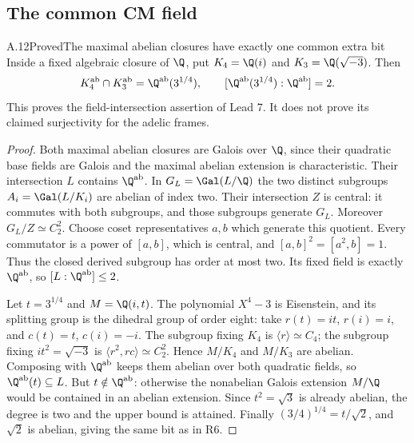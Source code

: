 \subsection{The common CM field}

\begin{statement}{A.12}{Proved}{The maximal abelian closures have exactly one common extra bit}
Inside a fixed algebraic closure of $\Q$, put
$K_4=\Q(i)$ and $K_3=\Q(\sqrt{-3})$. Then
\[
 K_4^{\rm ab}\cap K_3^{\rm ab}
       =\Q^{\rm ab}(3^{1/4}),\qquad
 [\Q^{\rm ab}(3^{1/4}):\Q^{\rm ab}]=2.
\]
This proves the field-intersection assertion of Lead 7. It
does not prove its claimed surjectivity for the adelic frames.
\end{statement}
\begin{proof}
Both maximal abelian closures are Galois over $\Q$, since
their quadratic base fields are Galois and the maximal
abelian extension is characteristic. Their intersection $L$
contains $\Q^{\rm ab}$. In $G_L=\Gal(L/\Q)$ the two
distinct subgroups $A_i=\Gal(L/K_i)$ are abelian of index
two. Their intersection $Z$ is central: it commutes with
both subgroups, and those subgroups generate $G_L$.
Moreover $G_L/Z\simeq C_2^2$. Choose coset representatives
$a,b$ which generate this quotient. Every commutator is
a power of $[a,b]$, which is central, and
$[a,b]^2=[a^2,b]=1$. Thus the closed derived subgroup
has order at most two. Its fixed field is exactly
$\Q^{\rm ab}$, so $[L:\Q^{\rm ab}]\le2$.

Let $t=3^{1/4}$ and $M=\Q(i,t)$. The polynomial $X^4-3$
is Eisenstein, and its splitting group is the dihedral group
of order eight: take $r(t)=it$, $r(i)=i$, and
$c(t)=t$, $c(i)=-i$. The subgroup fixing $K_4$ is
$\langle r\rangle\simeq C_4$; the subgroup fixing
$it^2=\sqrt{-3}$ is $\langle r^2,rc\rangle\simeq C_2^2$.
Hence $M/K_4$ and $M/K_3$ are abelian. Composing with
$\Q^{\rm ab}$ keeps them abelian over both quadratic fields,
so $\Q^{\rm ab}(t)\subseteq L$. But $t\notin\Q^{\rm ab}$:
otherwise the nonabelian Galois extension $M/\Q$ would be
contained in an abelian extension. Since $t^2=\sqrt3$ is
already abelian, the degree is two and the upper bound is
attained. Finally $(3/4)^{1/4}=t/\sqrt2$, and $\sqrt2$
is abelian, giving the same bit as in R6.
\end{proof}

